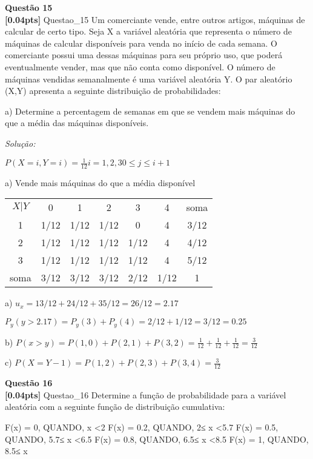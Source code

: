 \documentclass{article}
\newenvironment{problem}[2][Questão]
    { \begin{mdframed}[backgroundcolor=gray!20] \textbf{#1 #2} \\}
    {  \end{mdframed}}
\newenvironment{solution}
    {\textit{Solução:}}
    {}
\begin{document}
\begin{problem}{15}
\textbf{[0.04pts]} Questao\_15 Um  comerciante  vende,  entre  outros  artigos,  máquinas  de  calcular  de  certo  tipo. Seja X a variável aleatória que representa o número de máquinas de calcular disponíveis para venda no início de cada semana. O comerciante possui uma dessas máquinas para 
seu próprio uso, que poderá eventualmente vender, mas que não conta como disponível. O  número  de  máquinas  vendidas  semanalmente  é  uma  variável  aleatória  Y.  O  par 
aleatório (X,Y) apresenta a seguinte distribuição de probabilidades:

a) Determine  a  percentagem  de  semanas  em  que  se  vendem  mais  máquinas  do  que  a média das máquinas disponíveis.

\end{problem}

\begin{solution}

$P(X=i, Y=i) = \frac{1}{12} i=1,2,3 0 \leq j \leq i+1 $

a) Vende mais máquinas do que a média disponível

\begin{center}
\begin{tabular}{ |c|c|c|c|c|c|c|}
\hline

$X|Y$ & 0 & 1 & 2 & 3 & 4 & soma\\
1 & 1/12 & 1/12 & 1/12 & 0 & 4 & 3/12 \\
2 & 1/12 & 1/12 & 1/12 & 1/12 & 4 & 4/12 \\
3 & 1/12 & 1/12 & 1/12 & 1/12 & 4 & 5/12 \\
soma & 3/12 & 3/12 & 3/12 & 2/12 & 1/12 & 1  \\
 \hline
\end{tabular}
\end{center}

a) $u_{x} = 1 3/12 + 2 4/12 + 3 5/12 = 26/12 = 2.17$

$P_{y}(y>2.17) = P_{y}(3) + P_{y}(4) = 2/12 + 1/12 = 3/12 = 0.25$

b) $P(x>y) = P(1,0) + P(2,1) + P(3,2) = \frac{1}{12}+\frac{1}{12}+\frac{1}{12} = \frac{3}{12}$

c) $P(X=Y-1) = P(1,2) + P(2,3) + P(3,4) = \frac{3}{12}$




\end{solution}

\begin{problem}{16}
\textbf{[0.04pts]} Questao\_16 Determine  a  função  de  probabilidade  para  a  variável  aleatória  com  a  seguinte função de distribuição cumulativa:

F(x) = 0,   QUANDO, x <2
F(x) = 0.2, QUANDO, 2≤ x <5.7
F(x) = 0.5, QUANDO, 5.7≤ x <6.5
F(x) = 0.8, QUANDO, 6.5≤ x <8.5
F(x) = 1,   QUANDO, 8.5≤ x

\end{problem}
\end{document}
